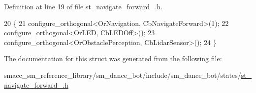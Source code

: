 Definition at line 19 of file st\+\_\+navigate\+\_\+forward\+\_.\+h.


\begin{DoxyCode}
20   \{
21     configure\_orthogonal<OrNavigation, CbNavigateForward>(1);
22     configure\_orthogonal<OrLED, CbLEDOff>();
23     configure\_orthogonal<OrObstaclePerception, CbLidarSensor>();
24   \}
\end{DoxyCode}


The documentation for this struct was generated from the following file\+:\begin{DoxyCompactItemize}
\item 
smacc\+\_\+sm\+\_\+reference\+\_\+library/sm\+\_\+dance\+\_\+bot/include/sm\+\_\+dance\+\_\+bot/states/\hyperlink{include_2sm__dance__bot_2states_2st__navigate__forward__1_8h}{st\+\_\+navigate\+\_\+forward\+\_.\+h}\end{DoxyCompactItemize}
